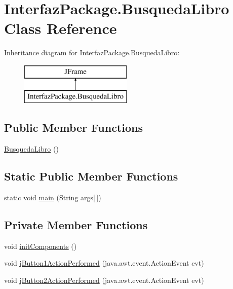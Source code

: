 \hypertarget{class_interfaz_package_1_1_busqueda_libro}{}\section{Interfaz\+Package.\+Busqueda\+Libro Class Reference}
\label{class_interfaz_package_1_1_busqueda_libro}
Inheritance diagram for Interfaz\+Package.\+Busqueda\+Libro\+:\begin{figure}[H]
\begin{center}
\leavevmode
\includegraphics[height=2.000000cm]{class_interfaz_package_1_1_busqueda_libro}
\end{center}
\end{figure}
\subsection*{Public Member Functions}
\begin{DoxyCompactItemize}
\item 
\mbox{\hyperlink{class_interfaz_package_1_1_busqueda_libro_a81c88fc8c319bd5a2f2869fa751f8571}{Busqueda\+Libro}} ()
\end{DoxyCompactItemize}
\subsection*{Static Public Member Functions}
\begin{DoxyCompactItemize}
\item 
static void \mbox{\hyperlink{class_interfaz_package_1_1_busqueda_libro_ae0833ceb18c926afdfe5bf3c379b70b3}{main}} (String args\mbox{[}$\,$\mbox{]})
\end{DoxyCompactItemize}
\subsection*{Private Member Functions}
\begin{DoxyCompactItemize}
\item 
void \mbox{\hyperlink{class_interfaz_package_1_1_busqueda_libro_a31f59f61bc58603e7a1e76ee35b116fc}{init\+Components}} ()
\item 
void \mbox{\hyperlink{class_interfaz_package_1_1_busqueda_libro_a25a437966d236ff48463e2ce6a5d9c03}{j\+Button1\+Action\+Performed}} (java.\+awt.\+event.\+Action\+Event evt)
\item 
void \mbox{\hyperlink{class_interfaz_package_1_1_busqueda_libro_afde7a423c97ad3cae7c3b1ea66ea54c2}{j\+Button2\+Action\+Performed}} (java.\+awt.\+event.\+Action\+Event evt)
\end{DoxyCompactItemize}
